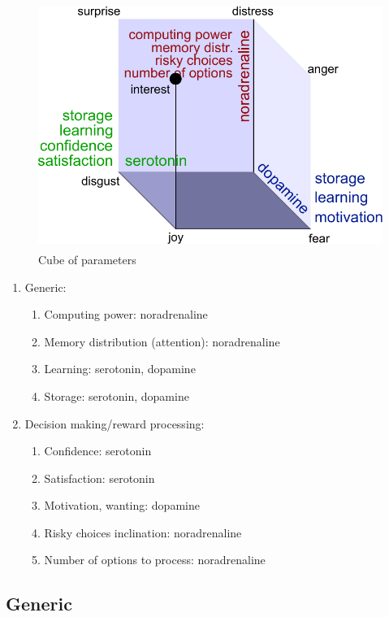 \begin{figure}
\begin{center}
 \includegraphics[height=8cm]{figure3_cube_of_parameters}
\end{center}
\caption{Cube of parameters}
\label{cube_of_parameters}
\end{figure}

\begin{enumerate}
 \item  Generic:
 \begin{enumerate}
  \item  Computing power: noradrenaline
  \item  Memory distribution (attention): noradrenaline
  \item  Learning: serotonin, dopamine
  \item  Storage: serotonin, dopamine
 \end{enumerate}
 \item  Decision making/reward processing:
 \begin{enumerate}
  \item  Confidence: serotonin
  \item  Satisfaction: serotonin
  \item  Motivation, wanting: dopamine
  \item  Risky choices inclination: noradrenaline
  \item  Number of options to process: noradrenaline
 \end{enumerate}
\end{enumerate}

\subsection{Generic}

